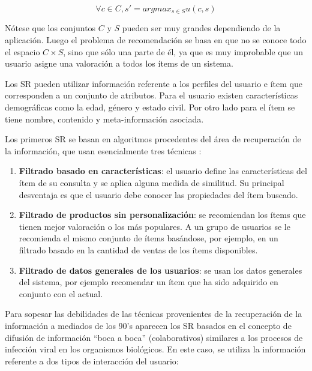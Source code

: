 \begin{equation}
\label{definicionformalsr}
\forall c \in C, s' =argmax_{s\in S} u(c,s)
\end{equation}

Nótese que los conjuntos $C$ y $S$ pueden ser muy grandes dependiendo de la aplicación. Luego el problema de recomendación se basa en que no se conoce todo el espacio $C \times S$, sino que sólo una parte de él, ya que es muy improbable que un usuario asigne una valoración a todos los ítems de un sistema.

Los SR pueden utilizar información referente a los perfiles del usuario e ítem que corresponden a un conjunto de atributos. Para el usuario existen características demográficas como la edad, género y estado civil. Por otro lado para el ítem se tiene nombre, contenido y meta-información asociada. 

Los primeros SR se basan en algoritmos procedentes del área de recuperación de la información, que usan esencialmente tres técnicas \citep{Adomavicius:2005}:

\begin{enumerate}
\item \textbf{Filtrado basado en características}: el usuario define las características del ítem de su consulta y se aplica alguna medida de similitud. Su principal desventaja es que el usuario debe conocer las propiedades del ítem buscado.

\item \textbf{Filtrado de productos sin personalización}: se recomiendan los ítems que tienen mejor valoración o los más populares. A un grupo de usuarios se le recomienda el mismo conjunto de ítems basándose, por ejemplo, en un filtrado basado en la cantidad de ventas de los ítems disponibles.

\item \textbf{Filtrado de datos generales de los usuarios}: se usan los datos generales del sistema, por ejemplo recomendar un ítem que ha sido adquirido en conjunto con el actual. 
\end{enumerate}

Para sopesar las debilidades de las técnicas provenientes de la recuperación de la información a mediados de los 90’s aparecen los SR basados en el concepto de difusión de información ``boca a boca'' (colaborativos) similares a los procesos de infección viral en los organismos biológicos. En este caso, se utiliza la información referente a dos tipos de interacción del usuario:


